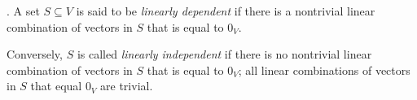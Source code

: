 \begin{definition}
     . A set $S \subseteq V$ is said to be \emph{linearly dependent} if there is a nontrivial linear combination of vectors in $S$ that is equal to $0_V$.

    Conversely, $S$ is called \emph{linearly independent} if there is no nontrivial linear combination of vectors in $S$ that is equal to $0_V$; all linear combinations of vectors in $S$ that equal $0_V$ are trivial.
\end{definition}
